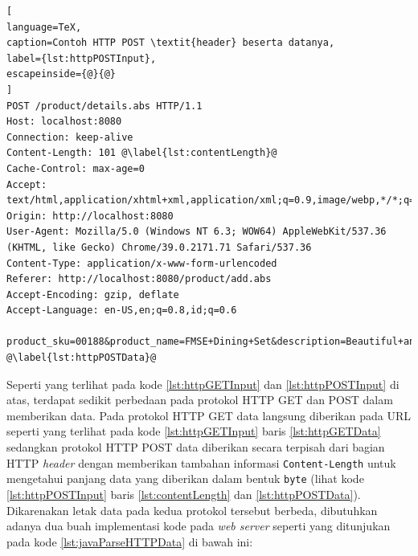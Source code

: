 \begin{lstlisting}[
language=TeX,
caption=Contoh HTTP POST \textit{header} beserta datanya,
label={lst:httpPOSTInput},
escapeinside={@}{@}
]
POST /product/details.abs HTTP/1.1
Host: localhost:8080
Connection: keep-alive
Content-Length: 101 @\label{lst:contentLength}@
Cache-Control: max-age=0
Accept: text/html,application/xhtml+xml,application/xml;q=0.9,image/webp,*/*;q=0.8
Origin: http://localhost:8080
User-Agent: Mozilla/5.0 (Windows NT 6.3; WOW64) AppleWebKit/537.36 (KHTML, like Gecko) Chrome/39.0.2171.71 Safari/537.36
Content-Type: application/x-www-form-urlencoded
Referer: http://localhost:8080/product/add.abs
Accept-Encoding: gzip, deflate
Accept-Language: en-US,en;q=0.8,id;q=0.6

product_sku=00188&product_name=FMSE+Dining+Set&description=Beautiful+and+Cute+Dining+Set&price=250000 @\label{lst:httpPOSTData}@
\end{lstlisting}

Seperti yang terlihat pada kode \ref{lst:httpGETInput} dan \ref{lst:httpPOSTInput} di atas, terdapat sedikit perbedaan pada protokol HTTP GET dan POST dalam memberikan data. Pada protokol HTTP GET data langsung diberikan pada URL seperti yang terlihat pada kode \ref{lst:httpGETInput} baris \ref{lst:httpGETData} sedangkan protokol HTTP POST data diberikan secara terpisah dari bagian HTTP \textit{header} dengan memberikan tambahan informasi \texttt{Content-Length} untuk mengetahui panjang data yang diberikan dalam bentuk \texttt{byte} (lihat kode \ref{lst:httpPOSTInput} baris \ref{lst:contentLength} dan \ref{lst:httpPOSTData}). Dikarenakan letak data pada kedua protokol tersebut berbeda, dibutuhkan adanya dua buah implementasi kode pada \textit{web server} seperti yang ditunjukan pada kode \ref{lst:javaParseHTTPData} di bawah ini:

